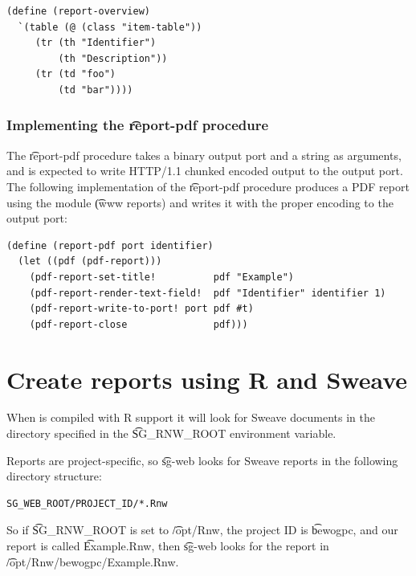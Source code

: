 \begin{siderules}
\begin{verbatim}
(define (report-overview)
  `(table (@ (class "item-table"))
     (tr (th "Identifier")
         (th "Description"))
     (tr (td "foo")
         (td "bar"))))
\end{verbatim}
\end{siderules}

\subsubsection{Implementing the \t{report-pdf} procedure}

  The \t{report-pdf} procedure takes a binary output port and a string as
  arguments, and is expected to write HTTP/1.1 chunked encoded output to
  the output port.  The following implementation of the \t{report-pdf}
  procedure produces a PDF report using the module \t{(www reports)}
  and writes it with the proper encoding to the output port:

\begin{siderules}
\begin{verbatim}
(define (report-pdf port identifier)
  (let ((pdf (pdf-report)))
    (pdf-report-set-title!          pdf "Example")
    (pdf-report-render-text-field!  pdf "Identifier" identifier 1)
    (pdf-report-write-to-port! port pdf #t)
    (pdf-report-close               pdf)))
\end{verbatim}
\end{siderules}

\pagebreak{}
\section{Create reports using R and Sweave}
\label{sec:sweave-reports}

  When  is compiled with R support it will look for
  Sweave documents in the directory specified in the \t{SG\_RNW\_ROOT}
  environment variable.

  Reports are project-specific, so \t{sg-web} looks for Sweave reports
  in the following directory structure:

\begin{siderules}
\begin{verbatim}
SG_WEB_ROOT/PROJECT_ID/*.Rnw
\end{verbatim}
\end{siderules}

  So if \t{SG\_RNW\_ROOT} is set to \t{/opt/Rnw}, the project ID is
  \t{bewogpc}, and our report is called \t{Example.Rnw}, then \t{sg-web}
  looks for the report in \t{/opt/Rnw/bewogpc/Example.Rnw}.
